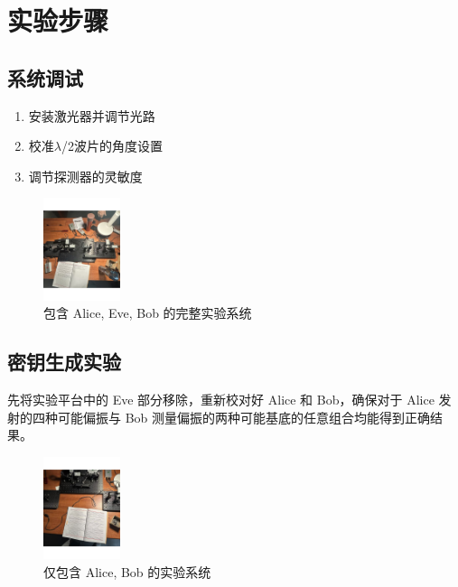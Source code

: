 \documentclass{ctexart}
\begin{document}
\section{实验步骤}
\subsection{系统调试}
\begin{enumerate}
\item 安装激光器并调节光路
\item 校准$\lambda$/2波片的角度设置
\item 调节探测器的灵敏度
\end{enumerate}

\begin{figure}[htbp]
    \centering
    \includegraphics[width=0.2\textwidth,height=0.3\textwidth]{pictures/微信图片_20241031162855.jpg}
    \caption{包含 Alice, Eve, Bob 的完整实验系统}
\end{figure}

\subsection{密钥生成实验}
先将实验平台中的 Eve 部分移除，重新校对好 Alice 和 Bob，确保对于 Alice 发射的四种可能偏振与 Bob 测量偏振的两种可能基底的任意组合均能得到正确结果。

\begin{figure}[htbp]
    \centering
    \includegraphics[width=0.2\textwidth,height=0.3\textwidth]{pictures/微信图片_20241031162758.jpg}
    \caption{仅包含 Alice, Bob 的实验系统}
\end{figure}
\end{document}
